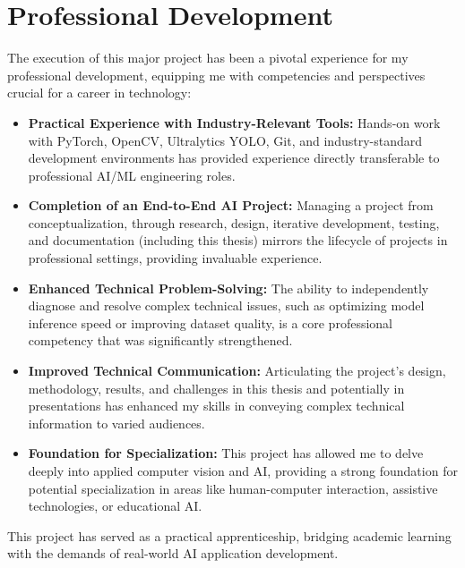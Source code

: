 \section{Professional Development}
The execution of this major project has been a pivotal experience for my professional development, equipping me with competencies and perspectives crucial for a career in technology:
\begin{itemize}
    \item \textbf{Practical Experience with Industry-Relevant Tools:} Hands-on work with PyTorch, OpenCV, Ultralytics YOLO, Git, and industry-standard development environments has provided experience directly transferable to professional AI/ML engineering roles.
    \item \textbf{Completion of an End-to-End AI Project:} Managing a project from conceptualization, through research, design, iterative development, testing, and documentation (including this thesis) mirrors the lifecycle of projects in professional settings, providing invaluable experience.
    \item \textbf{Enhanced Technical Problem-Solving:} The ability to independently diagnose and resolve complex technical issues, such as optimizing model inference speed or improving dataset quality, is a core professional competency that was significantly strengthened.
    \item \textbf{Improved Technical Communication:} Articulating the project's design, methodology, results, and challenges in this thesis and potentially in presentations has enhanced my skills in conveying complex technical information to varied audiences.
    \item \textbf{Foundation for Specialization:} This project has allowed me to delve deeply into applied computer vision and AI, providing a strong foundation for potential specialization in areas like human-computer interaction, assistive technologies, or educational AI.
\end{itemize}
This project has served as a practical apprenticeship, bridging academic learning with the demands of real-world AI application development.

